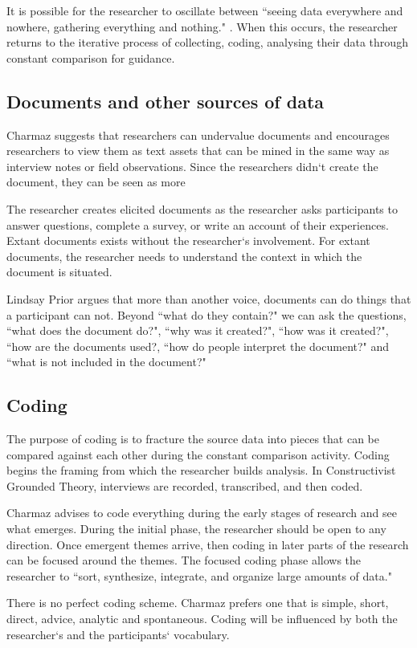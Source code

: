 It is possible for the researcher to oscillate between ``seeing data everywhere and nowhere, gathering everything and nothing." \cite{Charmaz}. When this occurs, the researcher returns to the iterative process of collecting, coding, analysing their data through constant comparison for guidance.

\subsection{Documents and other sources of data}
Charmaz suggests that researchers can undervalue documents and encourages researchers to view them as text assets that can be mined in the same way as interview notes or field observations. Since the researchers didn`t create the document, they can be seen as more  

The researcher creates elicited documents as the researcher asks participants to answer questions, complete a survey, or write an account of their experiences. Extant documents exists without the researcher`s involvement. For extant documents, the researcher needs to understand the context in which the document is situated. 

Lindsay Prior argues that more than another voice, documents can do things that a participant can not. Beyond ``what do they contain?" we can ask the questions, ``what does the document do?", ``why was it created?", ``how was it created?", ``how are the documents used?, ``how do people interpret the document?" and ``what is not included in the document?" \cite{Prior2003UsingDocuments}
\subsection{Coding}
The purpose of coding is to fracture the source data into pieces that can be compared against each other during the constant comparison activity. Coding begins the framing from which the researcher builds analysis. In Constructivist Grounded Theory, interviews are recorded, transcribed, and then coded.

Charmaz advises to code everything during the early stages of research and see what emerges. During the initial phase, the researcher should be open to any direction. Once emergent themes arrive, then coding in later parts of the research can be focused around the themes. The focused coding phase allows the researcher to ``sort, synthesize, integrate, and organize large amounts of data."

There is no perfect coding scheme. Charmaz prefers one that is simple, short, direct, advice, analytic and spontaneous. Coding will be influenced by both the researcher`s and the participants` vocabulary. 

